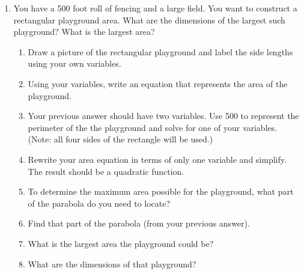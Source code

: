 



\begin{enumerate}

\item   You have a 500 foot roll of fencing and a large field.  You want to construct a rectangular playground area.  What are the dimensions of the largest such playground?  What is the largest area?
\begin{enumerate}
\item Draw a picture of the rectangular playground and label the side lengths using your own variables.
\vfill
\vfill
\item Using your variables, write an equation that represents the area of the playground.
\vfill
\item Your previous answer should have two variables.  Use 500 to represent the perimeter of the the playground and solve for one of your variables.  (Note: all four sides of the rectangle will be used.)
\vfill
\vfill
\item Rewrite your area equation in terms of only one variable and simplify.  The result should be a quadratic function.
\vfill


\newpage



\item To determine the maximum area possible for the playground, what part of the parabola do you need to locate?
\vfill

\item Find that part of the parabola (from your previous answer).
\vfill
\vfill
\item What is the largest area the playground could be?
\vfill

\item  What are the dimensions of that playground?
\vfill

\end{enumerate}







\end{enumerate}




